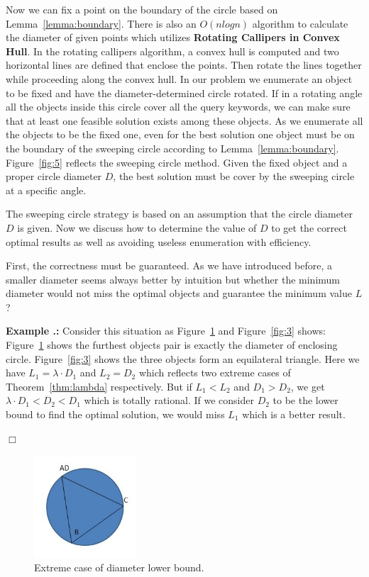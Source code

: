 \documentclass{sig-alternate}
\newcounter{example}[section]
\renewcommand{\theexample}{\nthesection.\arabic{example}}
\newenvironment{example}{
    \refstepcounter{example}
    {\vspace{1ex} \noindent\bf  Example  \theexample:}}{
    \eop\vspace{1ex}} %
\newcommand{\nthesection}{\arabic{section}}
\newcommand{\eop}{\hspace*{\fill}\mbox{$\Box$}}
\begin{document}
Now we can fix a point on the boundary of the circle based on Lemma~\ref{lemma:boundary}.
There is also an $O(nlogn)$ algorithm to calculate the diameter of given points 
which utilizes \textbf{Rotating Callipers in Convex Hull}. In the rotating callipers
algorithm, a convex hull is computed and two horizontal lines are defined
that enclose the points. Then rotate the lines together while proceeding along the
convex hull. In our problem we enumerate an object to be fixed and have the
diameter-determined circle rotated. If in a rotating angle all the objects inside
this circle cover all the query keywords, we can make sure that at least one feasible solution
exists among these objects. As we enumerate all the objects to be the fixed
one, even for the best solution one object must be on the boundary of the sweeping circle
according to Lemma~\ref{lemma:boundary}. Figure~\ref{fig:5} reflects the sweeping circle method.
Given the fixed object and a proper circle diameter $D$,
the best solution must be cover by the sweeping circle at a specific angle.
%

The sweeping circle strategy is based on an assumption that the circle diameter $D$
is given. Now we discuss how to determine the value of $D$ to get the
correct optimal results as well as avoiding useless enumeration with efficiency.
%

First, the correctness must be guaranteed. As we have introduced before, a smaller
diameter seems always better by intuition but whether the minimum diameter would 
not miss the optimal objects and guarantee the minimum value $L$?
%

\begin{example}\label{ex:counter}
Consider this situation as Figure~\ref{fig:2} and Figure~\ref{fig:3} shows:
Figure~\ref{fig:2} shows the furthest objects pair is exactly the diameter
of enclosing circle. Figure~\ref{fig:3} shows the three objects form an equilateral triangle.
Here we have $L_1 = \lambda\cdot D_1$ and $L_2 = D_2$ which reflects two extreme cases
of Theorem~\ref{thm:lambda} respectively. But if $L_1 < L_2$ and $D_1 > D_2$, we get
$\lambda\cdot D_1 < D_2 < D_1$ which is totally rational.
If we consider $D_2$ to be the lower bound to find the optimal solution,
we would miss $L_1$ which is a better result.
\end{example}
%

\begin{figure}\label{fig:2}
\begin{center}
\includegraphics[width=1.5in]{figure/fig2}
\caption{Extreme case of diameter lower bound.}
\end{center}
\end{figure}
\end{document}
